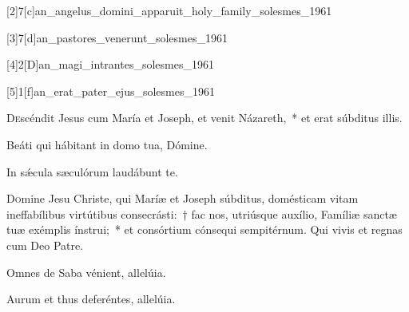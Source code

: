 \documentclass[vesperale_romanum.tex]{subfiles}
\begin{document}
[2]{7}[c]{an_angelus_domini_apparuit_holy_family_solesmes_1961}


[3]{7}[d]{an_pastores_venerunt_solesmes_1961}


[4]{2}[D]{an_magi_intrantes_solesmes_1961}
\label{ps_126_2}


[5]{1}[f]{an_erat_pater_ejus_solesmes_1961}



\lettrine{D}{e}scéndit Jesus cum María et Joseph, et venit Názareth,~* et erat súbditus illis.

\hymnus


\vv Beáti qui hábitant in domo tua, Dómine.

\rr In sǽcula sæculórum laudábunt te.


\oratio \label{or_sanctae_familiae}

\lettrine{D}{o}mine Jesu Christe, qui Maríæ et Joseph súbditus, domésticam vitam ineffabílibus virtútibus consecrásti:~† fac nos, utriúsque auxílio, Famíliæ sanctæ tuæ exémplis ínstrui;~* et consórtium cónsequi sempitérnum. Qui vivis et regnas cum Deo Patre.

\label{com_dom_in_oct_epiphaniae}
{}



\vv  Omnes de Saba vénient, allelúia.

\rr Aurum et thus deferéntes, allelúia.

\oratio \label{or_dom_1_pe} 

\end{document}
